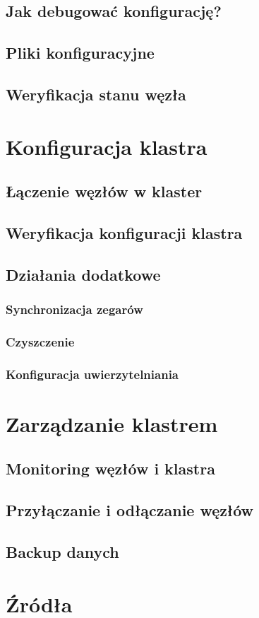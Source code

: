 \documentclass{article}
\begin{document}
\subsection{Jak debugować konfigurację?}

\subsection{Pliki konfiguracyjne}

\subsection{Weryfikacja stanu węzła}

\section{Konfiguracja klastra}

\subsection{Łączenie węzłów w klaster}

\subsection{Weryfikacja konfiguracji klastra}

\subsection{Działania dodatkowe}

\subsubsection{Synchronizacja zegarów}

\subsubsection{Czyszczenie}

\subsubsection{Konfiguracja uwierzytelniania}

\section{Zarządzanie klastrem}

\subsection{Monitoring węzłów i klastra}

\subsection{Przyłączanie i odłączanie węzłów}

\subsection{Backup danych}

\section*{Źródła}
\end{document}
